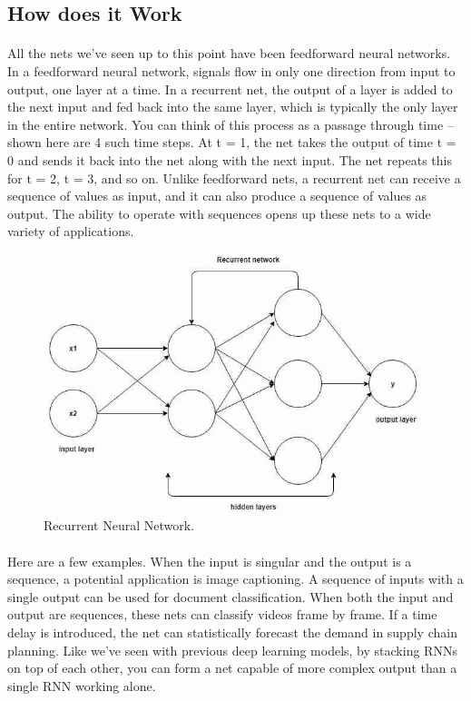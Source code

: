\documentclass{article}
\begin{document}
  \subsection{How does it Work}
    \paragraph{}
    All the nets we’ve seen up to this point have been feedforward neural networks. In a feedforward neural network, signals flow in only one direction from input to output, one layer at a time. In a recurrent net, the output of a layer is added to the next input and fed back into the same layer, which is typically the only layer in the entire network. You can think of this process as a passage through time – shown here are 4 such time steps. At t = 1, the net takes the output of time t = 0 and sends it back into the net along with the next input. The net repeats this for t = 2, t = 3, and so on. Unlike feedforward nets, a recurrent net can receive a sequence of values as input, and it can also produce a sequence of values as output. The ability to operate with sequences opens up these nets to a wide variety of applications.

    \begin{figure}[h!]
      \begin{center}
        \includegraphics[width=0.8\linewidth]{img/Recurrent.jpeg}
        \caption{Recurrent Neural Network.}
        \label{fig:snn}
      \end{center}
    \end{figure}
    
    \paragraph{}
    Here are a few examples. When the input is singular and the output is a sequence, a potential application is image captioning. A sequence of inputs with a single output can be used for document classification. When both the input and output are sequences, these nets can classify videos frame by frame. If a time delay is introduced, the net can statistically forecast the demand in supply chain planning. Like we’ve seen with previous deep learning models, by stacking RNNs on top of each other, you can form a net capable of more complex output than a single RNN working alone.
\end{document}
